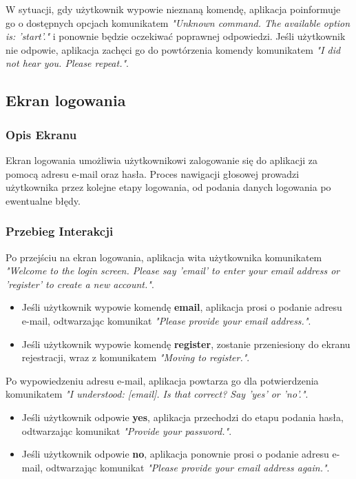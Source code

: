 W sytuacji, gdy użytkownik wypowie nieznaną komendę, aplikacja poinformuje go o dostępnych opcjach komunikatem \textit{"Unknown command. The available option is: 'start'."} i ponownie będzie oczekiwać poprawnej odpowiedzi. Jeśli użytkownik nie odpowie, aplikacja zachęci go do powtórzenia komendy komunikatem \textit{"I did not hear you. Please repeat."}.

\subsection{Ekran logowania}

\subsubsection{Opis Ekranu}
Ekran logowania umożliwia użytkownikowi zalogowanie się do aplikacji za pomocą adresu e-mail oraz hasła. Proces nawigacji głosowej prowadzi użytkownika przez kolejne etapy logowania, od podania danych logowania po ewentualne błędy.

\subsubsection{Przebieg Interakcji}
Po przejściu na ekran logowania, aplikacja wita użytkownika komunikatem \textit{"Welcome to the login screen. Please say 'email' to enter your email address or 'register' to create a new account."}.

\begin{itemize}
    \item Jeśli użytkownik wypowie komendę \textbf{email}, aplikacja prosi o podanie adresu e-mail, odtwarzając komunikat \textit{"Please provide your email address."}.
    \item Jeśli użytkownik wypowie komendę \textbf{register}, zostanie przeniesiony do ekranu rejestracji, wraz z komunikatem \textit{"Moving to register."}.
\end{itemize}

Po wypowiedzeniu adresu e-mail, aplikacja powtarza go dla potwierdzenia komunikatem \textit{"I understood: [email]. Is that correct? Say 'yes' or 'no'."}.

\begin{itemize}
    \item Jeśli użytkownik odpowie \textbf{yes}, aplikacja przechodzi do etapu podania hasła, odtwarzając komunikat \textit{"Provide your password."}.
    \item Jeśli użytkownik odpowie \textbf{no}, aplikacja ponownie prosi o podanie adresu e-mail, odtwarzając komunikat \textit{"Please provide your email address again."}.
\end{itemize}

